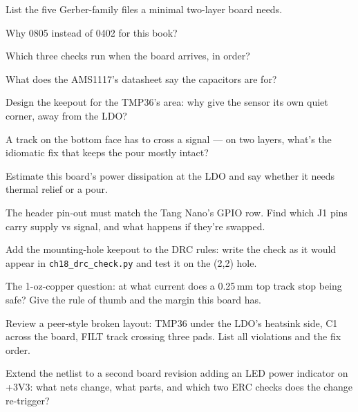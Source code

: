 \begin{exercise}[easy]
List the five Gerber-family files a minimal two-layer board needs.
\end{exercise}
\begin{exercise}[easy]
Why 0805 instead of 0402 for this book?
\end{exercise}
\begin{exercise}[easy]
Which three checks run when the board arrives, in order?
\end{exercise}
\begin{exercise}[easy]
What does the AMS1117's datasheet say the capacitors are for?
\end{exercise}
\begin{exercise}[medium]
Design the keepout for the TMP36's area: why give the sensor its own
quiet corner, away from the LDO?
\end{exercise}
\begin{exercise}[medium]
A track on the bottom face has to cross a signal --- on two layers,
what's the idiomatic fix that keeps the pour mostly intact?
\end{exercise}
\begin{exercise}[medium]
Estimate this board's power dissipation at the LDO and say whether
it needs thermal relief or a pour.
\end{exercise}
\begin{exercise}[medium]
The header pin-out must match the Tang Nano's GPIO row. Find which
J1 pins carry supply vs signal, and what happens if they're swapped.
\end{exercise}
\begin{exercise}[hard]
Add the mounting-hole keepout to the DRC rules: write the check as
it would appear in \texttt{ch18\_drc\_check.py} and test it on the
(2,2) hole.
\end{exercise}
\begin{exercise}[hard]
The 1-oz-copper question: at what current does a 0.25\,mm top track
stop being safe? Give the rule of thumb and the margin this board
has.
\end{exercise}
\begin{exercise}[hard]
Review a peer-style broken layout: TMP36 under the LDO's heatsink
side, C1 across the board, FILT track crossing three pads. List all
violations and the fix order.
\end{exercise}
\begin{exercise}[hard]
Extend the netlist to a second board revision adding an LED power
indicator on +3V3: what nets change, what parts, and which two ERC
checks does the change re-trigger?
\end{exercise}
